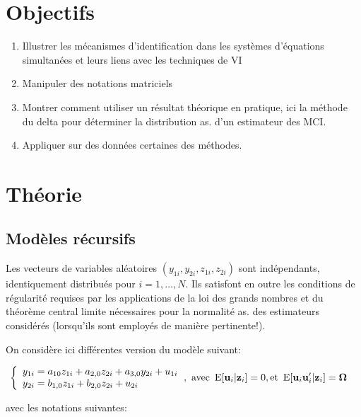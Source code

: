 \newpage

\tableofcontents

\newpage

\section{Objectifs}
\begin{enumerate}
\item Illustrer les mécanismes d’identification dans les systèmes d’équations simultanées et leurs liens avec les techniques de VI
\item Manipuler des notations matriciels
\item Montrer comment utiliser un résultat théorique en pratique, ici la méthode du delta pour déterminer la distribution as. 
d’un estimateur des MCI.
\item Appliquer sur des données certaines des méthodes.
\end{enumerate}

\section{Théorie}

\subsection{Modèles récursifs}
Les vecteurs de variables aléatoires $(y_{1i},y_{2i},z_{1i},z_{2i})$ sont indépendants, identiquement distribués pour 
$i= 1,\ldots, N$. Ils satisfont en outre les conditions de régularité requises par les applications de la loi
 des grands nombres et du théorème central limite nécessaires pour la normalité as. des estimateurs considérés 
 (lorsqu’ils sont employés de manière pertinente!). 

 On considère ici différentes version du modèle suivant:

    
 \begin{align}
    \left\{
 \begin{array}{l}
    y_{1i} = a_{10}z_{1i} + a_{2,0}z_{2i} + a_{3,0}y_{2i} +u_{1i}\\
    y_{2i}= b_{1,0}z_{1i} + b_{2,0}z_{2i}+u_{2i}
 \end{array}
\right.
&, \ \text{avec} \  \Exp[\boldu_i|\boldz_i] =0,  \text{et} \ \Exp[\boldu_i\boldu_i^\prime|\boldz_i]=\boldOmega
\label{eq1}
 \end{align}

 avec les notations suivantes:

